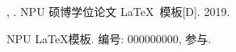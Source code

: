 \documentclass[twoside, UTF8, phd, AutoFakeBold]{nputhesis}
\begin{document}
\printbibliography             %

\Appendix   %

\Appendix*  %

\Thanks     %

\Work
\papersection  %

\begin{npulist}
  \item {\bf {}}, . NPU 硕博学位论文
    \LaTeX\ 模板[D]. 2019.
\end{npulist}

\researchsection %
\begin{npulist}
  \item NPU \LaTeX 模板.   编号: 000000000, 参与.
\end{npulist}
\statement
\end{document}
